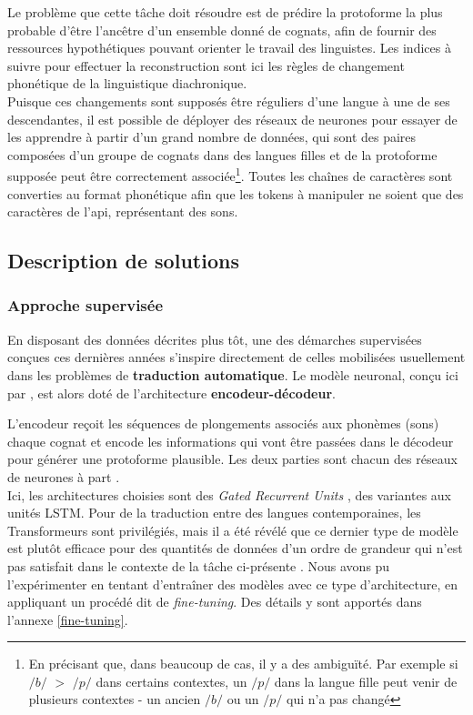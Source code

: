 \documentclass[12pt, twoside]{report}
\begin{document}
Le problème que cette tâche doit résoudre est de prédire la \gls{protoforme} la plus probable d'être l'ancêtre d'un ensemble donné de \glspl{cognat}, afin de fournir des ressources hypothétiques pouvant orienter le travail des linguistes. Les indices à suivre pour effectuer la reconstruction sont ici les règles de changement phonétique de la linguistique diachronique.\\
\indent Puisque ces changements sont supposés être réguliers d'une langue à une de ses descendantes, il est possible de déployer des réseaux de neurones pour essayer de les apprendre à partir d'un grand nombre de données, qui sont des paires composées d'un groupe de \glspl{cognat} dans des langues filles et de la \gls{protoforme} supposée peut être correctement associée\footnote{En précisant que, dans beaucoup de cas, il y a des ambiguïté. Par exemple si $/b/$ $>$ $/p/$ dans certains contextes, un $/p/$ dans la langue fille peut venir de plusieurs contextes - un ancien $/b/$ ou un $/p/$ qui n’a pas changé}. Toutes les chaînes de caractères sont converties au format phonétique afin que les tokens à manipuler ne soient que des caractères de l'\Gls{api}, représentant des sons.


\subsection{Description de solutions}
\subsubsection{Approche supervisée} \label{descr_meloni}
En disposant des données décrites plus tôt, une des démarches supervisées conçues ces dernières années s'inspire directement de celles mobilisées usuellement dans les problèmes de \textbf{traduction automatique}. Le modèle neuronal, conçu ici par \cite{meloni-etal-2021-ab}, est alors doté de l'architecture \textbf{encodeur-décodeur}.

L'encodeur reçoit les séquences de plongements associés aux phonèmes (sons) chaque \gls{cognat} et encode les informations qui vont être passées dans le décodeur pour générer une \gls{protoforme} plausible. Les deux parties sont chacun des réseaux de neurones à part \autocite[pour avoir un parallèle avec la traduction automatique plus généralement, voir][chap.9, p.17-21]{jurafsky}.\\
Ici, les architectures choisies sont des \textit{Gated Recurrent Units} \autocite{gru}, des variantes aux unités LSTM. Pour de la traduction entre des langues contemporaines, les Transformeurs sont privilégiés, mais il a été révélé que ce dernier type de modèle est plutôt efficace pour des quantités de données d'un ordre de grandeur qui n'est pas satisfait dans le contexte de la tâche ci-présente \autocite{fourrier, araabi-monz-2020-optimizing, bawden-etal-2022-automatic}. Nous avons pu l'expérimenter en tentant d'entraîner des modèles avec ce type d'architecture, en appliquant un procédé dit de \textit{fine-tuning}. Des détails y sont apportés dans l'annexe \ref{fine-tuning}.\\
\end{document}
